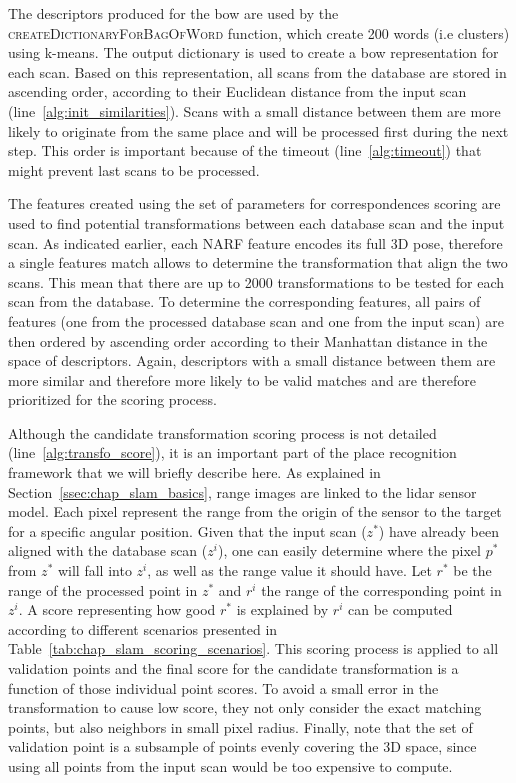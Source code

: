 The descriptors produced for the \gls*{bow} are used by the \textsc{createDictionaryForBagOfWord} function, which create 200 words (i.e clusters) using k-means. The output dictionary is used to create a \gls*{bow} representation for each scan. Based on this representation, all scans from the database are stored in ascending order, according to their Euclidean distance from the input scan (line~\ref{alg:init_similarities}). Scans with a small distance between them are more likely to originate from the same place and will be processed first during the next step. This order is important because of the timeout (line~\ref{alg:timeout}) that might prevent last scans to be processed.

The features created using the set of parameters for correspondences scoring are used to find potential transformations between each database scan and the input scan. As indicated earlier, each NARF feature encodes its full 3D pose, therefore a single features match allows to determine the transformation that align the two scans. This mean that there are up to 2000 transformations to be tested for each scan from the database. To determine the corresponding features, all pairs of features (one from the processed database scan and one from the input scan) are then ordered by ascending order according to their Manhattan distance in the space of descriptors. Again, descriptors with a small distance between them are more similar and therefore more likely to be valid matches and are therefore prioritized for the scoring process.

Although the candidate transformation scoring process is not detailed (line~\ref{alg:transfo_score}), it is an important part of the place recognition framework that we will briefly describe here. As explained in Section~\ref{ssec:chap_slam_basics}, range images are linked to the \gls*{lidar} sensor model. Each pixel represent the range from the origin of the sensor to the target for a specific angular position. Given that the input scan ($z^*$) have already been aligned with the database scan ($z^i$), one can easily determine where the pixel $p^*$ from $z^*$ will fall into $z^i$, as well as the range value it should have. Let $r^*$ be the range of the processed point in $z^*$ and $r^i$ the range of the corresponding point in $z^i$. A score representing how good $r^*$ is explained by $r^i$ can be computed according to different scenarios presented in Table~\ref{tab:chap_slam_scoring_scenarios}.
This scoring process is applied to all validation points and the final score for the candidate transformation is a function of those individual point scores. To avoid a small error in the transformation to cause low score, they not only consider the exact matching points, but also neighbors in small pixel radius. Finally, note that the set of validation point is a subsample of points evenly covering the 3D space, since using all points from the input scan would be too expensive to compute.

